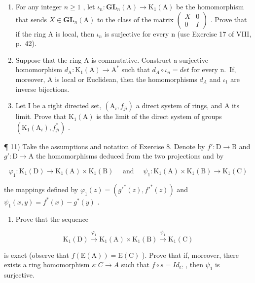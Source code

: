 \begin{enumerate}
\def\labelenumi{\alph{enumi})}
\item
  For any integer \(n \geqslant 1\) , let \(\iota_{n} : \mathbf{GL}_{n}(\mathrm{A}) \to \mathrm{K}_{1}(\mathrm{A})\) be the homomorphism that sends \(X \in \mathbf{GL}_{n}(\mathrm{A})\) to the class of the matrix \(\begin{pmatrix} X & 0 \\ 0 & I \end{pmatrix}\) . Prove that if the ring A is local, then \(\iota_{n}\) is surjective for every n (use Exercise 17 of VIII, p.~42).
\item
  Suppose that the ring A is commutative. Construct a surjective homomorphism \(d_{\mathrm{A}} : \mathrm{K}_{1}(\mathrm{A}) \to \mathrm{A}^{*}\) such that \(d_{A} \circ \iota_{n} = det\) for every n.~If, moreover, A is local or Euclidean, then the homomorphisms \(d_{A}\) and \(\iota_{1}\) are inverse bijections.
\item
  Let I be a right directed set, \((\mathrm{A}_{i}, f_{ji})\) a direct system of rings, and A its limit. Prove that \(\mathrm{K}_{1}(\mathrm{A})\) is the limit of the direct system of groups \((\mathrm{K}_{1}(\mathrm{A}_{i}), f_{ji}^{*})\) .
\end{enumerate}

¶ 11) Take the assumptions and notation of Exercise 8. Denote by \(f': \mathrm{D} \to \mathrm{B}\) and \(g': \mathrm{D} \to \mathrm{A}\) the homomorphisms deduced from the two projections and by

\[
\varphi_ {1}: \mathrm{K} _ {1} (\mathrm{D}) \rightarrow \mathrm{K} _ {1} (\mathrm{A}) \times \mathrm{K} _ {1} (\mathrm{B}) \quad \text { and } \quad \psi_ {1}: \mathrm{K} _ {1} (\mathrm{A}) \times \mathrm{K} _ {1} (\mathrm{B}) \rightarrow \mathrm{K} _ {1} (\mathrm{C})
\]

the mappings defined by \(\varphi_1(z) = (g'^* (z), f'^* (z))\) and \(\psi_1(x,y) = f^* (x) - g^* (y)\) .

\begin{enumerate}
\def\labelenumi{\alph{enumi})}
\tightlist
\item
  Prove that the sequence
\end{enumerate}

\[
\mathrm{K} _ {1} (\mathrm{D}) \xrightarrow {\varphi_ {1}} \mathrm{K} _ {1} (\mathrm{A}) \times \mathrm{K} _ {1} (\mathrm{B}) \xrightarrow {\psi_ {1}} \mathrm{K} _ {1} (\mathrm{C})
\]

is exact (observe that \(f(\mathrm{E}(\mathrm{A})) = \mathrm{E}(\mathrm{C})\) ). Prove that if, moreover, there exists a ring homomorphism \(s : C \to A\) such that \(f \circ s = Id_{C}\) , then \(\psi_{1}\) is surjective.

